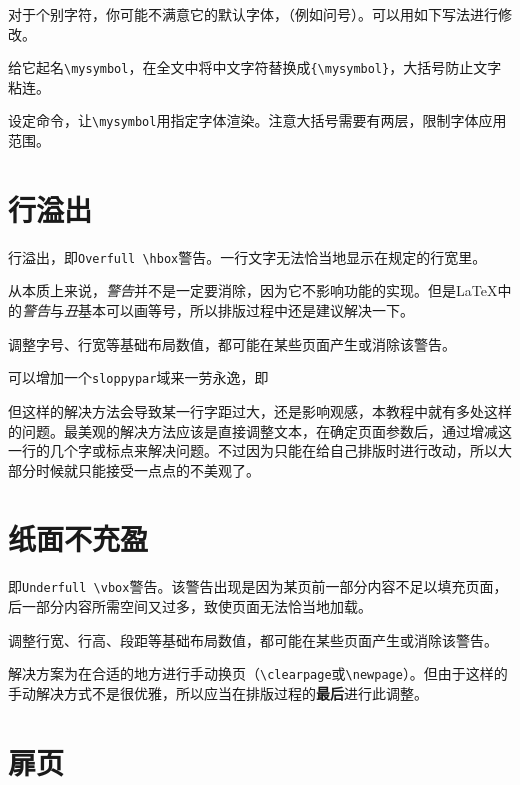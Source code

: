 \documentclass[10pt,openany]{book}
\begin{document}
\begin{sloppypar}
    对于个别字符，你可能不满意它的默认字体，（例如问号）。可以用如下写法进行修改。

    给它起名\texttt{\textbackslash{}mysymbol}，在全文中将中文字符替换成\texttt{\{\textbackslash{}mysymbol\}}，大括号防止文字粘连。

    设定命令，让\texttt{\textbackslash{}mysymbol}用指定字体渲染。注意大括号需要有两层，限制字体应用范围。

    

    \section{行溢出}

    行溢出，即\texttt{Overfull\ \textbackslash{}hbox}警告。一行文字无法恰当地显示在规定的行宽里。

    从本质上来说，\emph{警告}并不是一定要消除，因为它不影响功能的实现。但是{\LaTeX}中的\emph{警告}与\emph{丑}基本可以画等号，所以排版过程中还是建议解决一下。

    调整字号、行宽等基础布局数值，都可能在某些页面产生或消除该警告。

    可以增加一个\texttt{sloppypar}域来一劳永逸，即

    

    但这样的解决方法会导致某一行字距过大，还是影响观感，本教程中就有多处这样的问题。最美观的解决方法应该是直接调整文本，在确定页面参数后，通过增减这一行的几个字或标点来解决问题。不过因为只能在给自己排版时进行改动，所以大部分时候就只能接受一点点的不美观了。

    \section{纸面不充盈}

    即\texttt{Underfull\ \textbackslash{}vbox}警告。该警告出现是因为某页前一部分内容不足以填充页面，后一部分内容所需空间又过多，致使页面无法恰当地加载。

    调整行宽、行高、段距等基础布局数值，都可能在某些页面产生或消除该警告。

    解决方案为在合适的地方进行手动换页（\texttt{\textbackslash{}clearpage}或\texttt{\textbackslash{}newpage}）。但由于这样的手动解决方式不是很优雅，所以应当在排版过程的\textbf{最后}进行此调整。

    \section{扉页}


\end{sloppypar}
\end{document}
